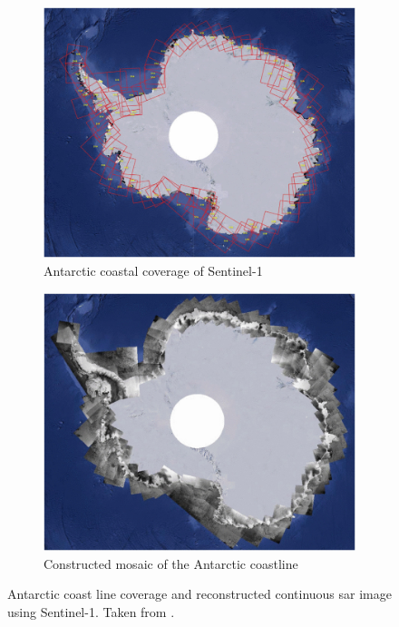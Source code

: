 \begin{figure}[H]
	\centering
	\begin{subfigure}[t]{.48\linewidth}
		\includegraphics[width=\linewidth]{Figures/LiteratureReview/Satellites/sentinelCoverageCoast.jpg} 
 		\caption{Antarctic coastal coverage of Sentinel-1}
            \label{fig:litReview.sarCharac.satellites.sentinel.coverageCoast.sentinel}
	\end{subfigure}
	\hfill
	\begin{subfigure}[t]{.48\linewidth}
        \centering
		\includegraphics[width=0.98\linewidth]{Figures/LiteratureReview/Satellites/sentinelCoverageCoastMosaic.jpg} 
 		\caption{Constructed mosaic of the Antarctic coastline}
            \label{fig:litReview.sarCharac.satellites.sentinel.coverageCoast.mosaic}
	\end{subfigure}
    \caption{Antarctic coast line coverage and reconstructed continuous \acs{sar} image using Sentinel-1. Taken from \cite{Garkusha2020}.}
    \label{fig:litReview.sarCharac.satellites.sentinel.coverageCoast}
\end{figure}

